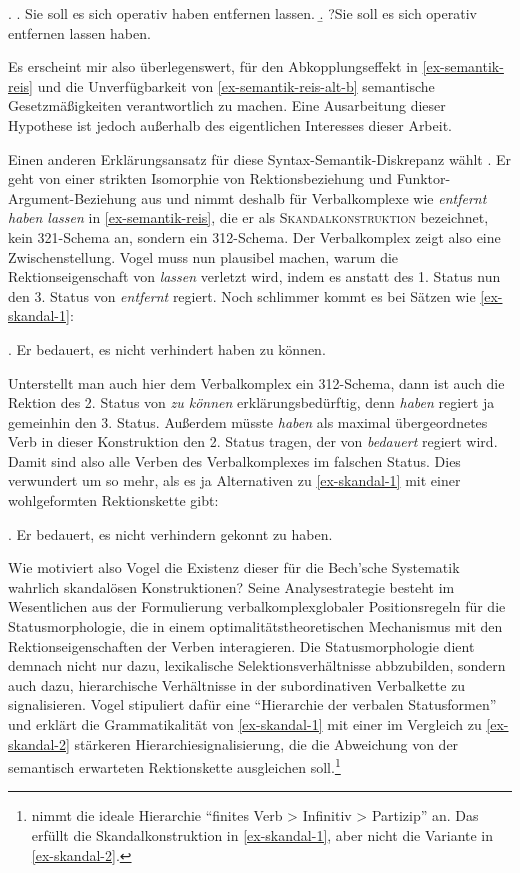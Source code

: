\ex. \label{ex-semantik-invert}
\a. Sie soll es sich operativ haben entfernen lassen. \label{ex-semantik-invert-a}
\b. ?Sie soll es sich operativ entfernen lassen haben.

Es erscheint mir also überlegenswert, für den Abkopplungseffekt in \ref{ex-semantik-reis} und die Unverfügbarkeit von \ref{ex-semantik-reis-alt-b} semantische Gesetzmä\ss igkeiten verantwortlich zu machen. Eine Ausarbeitung dieser Hypothese ist jedoch au\ss erhalb des eigentlichen Interesses dieser Arbeit.  

Einen anderen Erklärungsansatz für diese Syntax-Semantik-Diskrepanz wählt \cite{Vogel:09}. Er geht von einer strikten Isomorphie von Rektionsbeziehung und Funktor-Argument-Bezie\-hung aus und nimmt deshalb für Verbalkomplexe wie {\it entfernt haben lassen} in \ref{ex-semantik-reis}, die er als \textsc{Skandalkonstruktion} bezeichnet, kein 321-Schema an, sondern ein 312-Schema. Der Verbalkomplex zeigt also eine Zwischenstellung. Vogel muss nun plausibel machen, warum die Rektionseigenschaft von {\it lassen} verletzt wird, indem es anstatt des 1. Status nun den 3. Status von {\it entfernt} regiert. Noch schlimmer kommt es bei Sätzen wie \ref{ex-skandal-1}:\largerpage%

\ex. Er bedauert, es nicht verhindert haben zu können. \hfill \citep[(1)]{Vogel:09}\label{ex-skandal-1}

Unterstellt man auch hier dem Verbalkomplex ein 312-Schema, dann ist auch die Rektion des 2. Status von {\it zu können} erklärungsbedürftig, denn {\it haben} regiert ja gemeinhin den 3. Status. Au\ss erdem müsste {\it haben} als maximal übergeordnetes Verb in dieser Konstruktion den 2. Status tragen, der von {\it bedauert} regiert wird. Damit sind also alle Verben des Verbalkomplexes im falschen Status. Dies verwundert um so mehr, als es ja Alternativen zu \ref{ex-skandal-1} mit einer wohlgeformten Rektionskette gibt:  

\ex. Er bedauert, es nicht verhindern gekonnt zu haben. \hfill \citep[(9d)]{Vogel:09}\label{ex-skandal-2}

Wie motiviert also Vogel die Existenz dieser für die Bech'sche Systematik wahrlich skandalösen Konstruktionen? Seine Analysestrategie besteht im Wesentlichen aus der Formulierung verbalkomplexglobaler Positionsregeln für die Statusmorphologie, die in einem optimalitätstheoretischen Mechanismus mit den Rektionseigenschaften der Verben interagieren. Die Statusmorphologie dient demnach nicht nur dazu, lexikalische Selektionsverhältnisse abbzubilden, sondern auch dazu, hierarchische Verhältnisse in der subordinativen Verbalkette zu signalisieren. Vogel stipuliert dafür eine "`Hierarchie der verbalen Statusformen"' und erklärt die Grammatikalität von \ref{ex-skandal-1} mit einer im Vergleich zu \ref{ex-skandal-2} stärkeren Hierarchiesignalisierung, die die Abweichung von der semantisch erwarteten Rektionskette ausgleichen soll.\footnote{\citet[(52)]{Vogel:09} nimmt die ideale Hierarchie "`finites Verb > Infinitiv > Partizip"' an. Das erfüllt die Skandalkonstruktion in \ref{ex-skandal-1}, aber nicht die Variante in \ref{ex-skandal-2}.}

